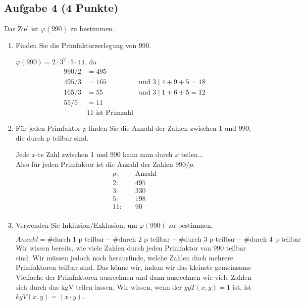 \documentclass{article} %
\begin{document}
    \subsection*{Aufgabe 4 (4 Punkte)}
    Das Ziel ist $\varphi(990)$ zu bestimmen.
    \begin{enumerate}
        \item[(a)] Finden Sie die Primfaktorzerlegung von $990$.
        \begin{mybox}
        $\varphi(990)=2\cdot 3^2\cdot5\cdot11$, da 
        \begin{align*}
            990 / 2 & = 495 & \\
            495 / 3 & =165 & \text{und } 3 \mid 4+9+5=18  \\
            165 / 3 & = 55 & \text{und } 3 \mid 1+6+5=12 \\
            55/5& =11 \\
            & 11 \text{ ist Primzahl} 
        \end{align*}
        \end{mybox}
        \item[(b)] Für jeden Primfaktor $p$ finden Sie die Anzahl der Zahlen zwischen $1$ und $990$, die durch $p$ teilbar sind.
        \begin{mybox}
         Jede $x$-te Zahl zwischen 1 und 990 kann man durch $x$ teilen...\\
        Also für jeden Primfaktor ist die Anzahl der Zahlen $990/ p$.
        \begin{align*}
            p :& \quad \text{Anzahl} \\
            2: & \quad 495\\
            3 :&\quad 330 \\
            5 :&\quad 198\\
            11 :& \quad 90\\
        \end{align*}
        \end{mybox}
        \item[(c)] Verwenden Sie Inklusion/Exklusion, um $\varphi(990)$ zu bestimmen.
        \begin{mybox}
        \[Anzahl = \text{\#durch 1 p teilbar} - \text{\#durch 2 p teilbar} + \text{\#durch 3 p teilbar} - \text{\#durch 4 p teilbar}\]
        Wir wissen bereits, wie viele Zahlen durch jeden Primfaktor von 990 teilbar sind. Wir müssen jedoch noch herausfinde, welche Zahlen duch mehrere Primfaktoren teilbar sind. Das könne wir, indem wir das kleinste gemeinsame Vielfache der Primfaktoren ausrechnen und dann ausrechnen wie viele Zahlen sich durch das kgV teilen lassen. Wir wissen, wenn der $ggT(x,y)=1$ ist, ist $kgV(x,y)=(x \cdot y)$. 

\end{mybox}
\end{enumerate}
\end{document}
